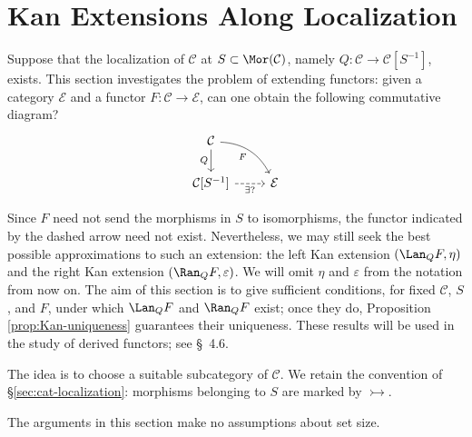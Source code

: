 
\section{Kan Extensions Along Localization}\label{sec:functor-localization}
\hypertarget{o014.aljabr2.chapter1.kan-extensions-along-localization}{ }

Suppose that the localization of $\mathcal{C}$ at
$S\subset\Mor(\mathcal{C})$, namely
$Q:\mathcal{C}\to\mathcal{C}[S^{-1}]$, exists. This section investigates the
problem of extending functors: given a category $\mathcal{E}$ and a functor
$F:\mathcal{C}\to\mathcal{E}$, can one obtain the following commutative
diagram?
\[\begin{tikzcd}
	\mathcal{C} \arrow[d, "Q"'] \arrow[rd, bend left, "F"'] & \\
	\mathcal{C}{[S^{-1}]} \arrow[dashed, r, "\exists? "'] & \mathcal{E}
\end{tikzcd}\]

Since $F$ need not send the morphisms in $S$ to isomorphisms, the functor
indicated by the dashed arrow need not exist. Nevertheless, we may still seek
the best possible approximations to such an extension: the left Kan extension
$(\Lan_QF,\eta)$ and the right Kan extension $(\Ran_QF,\varepsilon)$. We will
omit $\eta$ and $\varepsilon$ from the notation from now on. The aim of this
section is to give sufficient conditions, for fixed $\mathcal{C}$, $S$, and
$F$, under which $\Lan_QF$ and $\Ran_QF$ exist; once they do, Proposition
\ref{prop:Kan-uniqueness} guarantees their uniqueness. These results will be
used in the study of derived functors; see \S~4.6.

The idea is to choose a suitable subcategory of $\mathcal{C}$. We retain the
convention of \S\ref{sec:cat-localization}: morphisms belonging to $S$ are
marked by $\rightarrowtail$.

The arguments in this section make no assumptions about set size.

